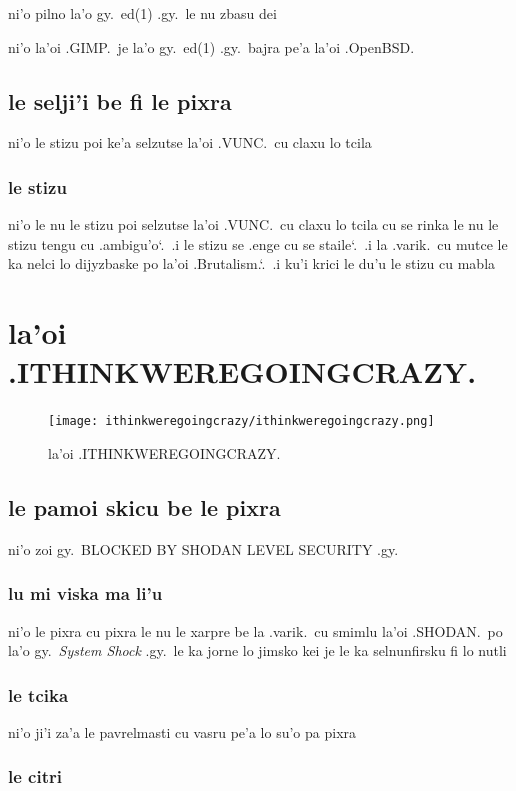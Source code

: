 \documentclass{report}
\newcommand\sds{\spacefactor\sfcode`.\ \space}
\begin{document}
ni'o pilno la'o gy.\ ed(1) .gy.\ le nu zbasu dei

ni'o la'oi .GIMP.\ je la'o gy.\ ed(1) .gy.\ bajra pe'a la'oi .OpenBSD.

\section{le selji'i be fi le pixra}
ni'o le stizu poi ke'a selzutse la'oi .VUNC.\ cu claxu lo tcila

\subsection{le stizu}
ni'o le nu le stizu poi selzutse la'oi .VUNC.\ cu claxu lo tcila cu se rinka le nu le stizu tengu cu .ambigu'o\sds  .i le stizu se .enge cu se staile\sds  .i la .varik.\ cu mutce le ka nelci lo dijyzbaske po la'oi .Brutalism.\sds  .i ku'i krici le du'u le stizu cu mabla

\chapter{la'oi .ITHINKWEREGOINGCRAZY.}
\begin{figure}[ht]
	\centering
	\texttt{[image: ithinkweregoingcrazy/ithinkweregoingcrazy.png]}
	\caption[center]{la'oi .ITHINKWEREGOINGCRAZY.}
\end{figure}
\section{le pamoi skicu be le pixra}
ni'o zoi gy.\ BLOCKED BY SHODAN LEVEL SECURITY .gy.

\subsection{lu mi viska ma li'u}
ni'o le pixra cu pixra le nu le xarpre be la .varik.\ cu smimlu la'oi .SHODAN.\ po la'o gy.\ \textit{System Shock} .gy.\ le ka jorne lo jimsko kei je le ka selnunfirsku fi lo nutli

\subsection{le tcika}
ni'o ji'i za'a le pavrelmasti cu vasru pe'a lo su'o pa pixra

\subsection{le citri}
\end{document}
